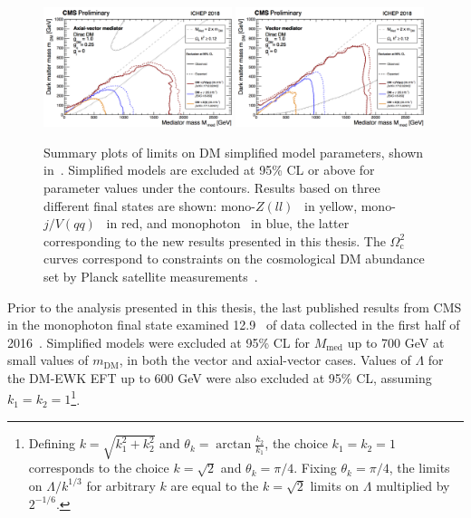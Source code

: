\documentclass[oneside, letterpaper, 12pt, oldfontcommands]{memoir}
\begin{document}
\begin{figure}[hbtb]
  \begin{center}
    \includegraphics[width=0.49\textwidth]{Figures/dmsimp_ichep2018_av.png}
    \includegraphics[width=0.49\textwidth]{Figures/dmsimp_ichep2018_v.png}
    \caption{Summary plots of limits on DM simplified model parameters, shown in~\cite{ref:dmsummaryplots_ichep2018}. Simplified models are excluded at 95\% CL or above
    for parameter values under the contours.
    Results based on three different final states are shown: mono-$Z(ll)$~\cite{ref:epjc/s10052-018-5740-1} in yellow, mono-$j/V(qq)$~\cite{ref:PhysRevD.97.092005} in red, and monophoton~\cite{ref:1810.00196} in blue,
    the latter corresponding to the new results presented in this thesis. The $\Omega_\mathrm{c}^{2}$ curves correspond to constraints on the cosmological DM abundance set by Planck satellite measurements~\cite{ref:planck2018_cosparams}.}
    \label{fig:dmsimp_ichep2018}
  \end{center}
\end{figure}

Prior to the analysis presented in this thesis, the last published results from CMS in the monophoton final state examined 12.9 \fbinv\ of data collected in the first half
of 2016~\cite{ref:JHEP10(2017)073}. Simplified models were excluded at 95\% CL for $M_\mathrm{med}$ up to 700 GeV at small values of $m_\mathrm{DM}$, in both the vector
and axial-vector cases. Values of $\Lambda$ for the DM-EWK EFT up to 600 GeV were also excluded at 95\% CL, assuming $k_{1} = k_{2} = 1$\footnote{Defining $k = \sqrt{k_{1}^{2} + k_{2}^{2}}$
and $\theta_{k} = \arctan{\frac{k_{2}}{k_{1}}}$, the choice $k_{1} = k_{2} = 1$ corresponds to the choice $k = \sqrt{2}$ and $\theta_{k} = \pi/4$. Fixing $\theta_{k} = \pi/4$,
the limits on $\Lambda / k^{1/3}$ for arbitrary $k$ are equal to the $k = \sqrt{2}$ limits on $\Lambda$ multiplied by $2^{-1/6}$.}.
\end{document}
